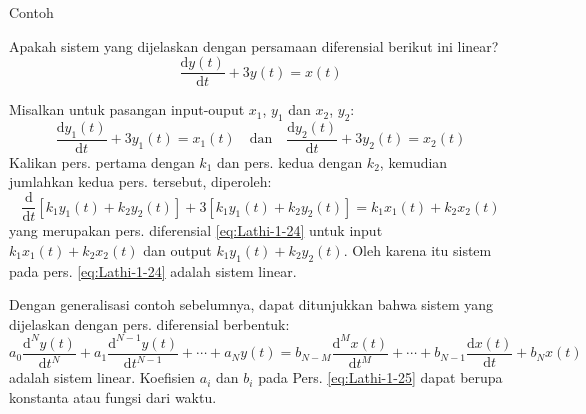 \begin{frame}{Contoh}

\fontsize{9}{10}\selectfont

Apakah sistem yang dijelaskan dengan persamaan diferensial berikut ini linear?
\begin{equation}
\frac{\mathrm{d} y(t)}{\mathrm{d}t} + 3 y(t) = x(t)
\label{eq:Lathi-1-24}
\end{equation}

Misalkan untuk pasangan input-ouput $x_1$, $y_1$ dan $x_2$, $y_2$:
\begin{equation*}
\frac{\mathrm{d} y_{1}(t)}{\mathrm{d}t} + 3 y_{1}(t) = x_{1}(t) \quad \text{dan} \quad
\frac{\mathrm{d} y_{2}(t)}{\mathrm{d}t} + 3 y_{2}(t) = x_{2}(t)
\end{equation*}
Kalikan pers. pertama dengan $k_1$ dan pers. kedua dengan $k_2$, kemudian jumlahkan
kedua pers. tersebut, diperoleh:
$$
\frac{\mathrm{d}}{\mathrm{d}t} \left[
  k_{1} y_{1}(t) + k_{2} y_{2}(t) \right] +
3 \left[ k_{1} y_{1}(t) + k_{2} y_{2}(t) \right] =
k_{1} x_{1}(t) + k_{2} x_{2}(t)
$$
yang merupakan pers. diferensial \eqref{eq:Lathi-1-24} untuk input
$k_{1} x_{1}(t) + k_{2} x_{2}(t)$ dan output $k_{1} y_{1}(t) + k_{2} y_{2}(t)$.
Oleh karena itu sistem pada pers. \eqref{eq:Lathi-1-24} adalah sistem linear.

\end{frame}


\begin{frame}

Dengan generalisasi contoh sebelumnya, dapat ditunjukkan bahwa sistem yang dijelaskan
dengan pers. diferensial berbentuk:
\begin{equation}
a_0 \frac{\mathrm{d}^{N} y(t)}{\mathrm{d}t^{N}} + a_1 \frac{\mathrm{d}^{N-1} y(t)}{\mathrm{d}t^{N-1}} +
\cdots + a_{N} y(t) = b_{N-M} \frac{\mathrm{d}^{M} x(t)}{\mathrm{d}t^{M}} + \cdots +
b_{N-1} \frac{\mathrm{d} x(t)}{\mathrm{d}t} + b_{N} x(t)
\label{eq:Lathi-1-25}
\end{equation}
adalah sistem linear. Koefisien $a_{i}$ dan $b_{i}$ pada Pers. \eqref{eq:Lathi-1-25} dapat berupa
konstanta atau fungsi dari waktu.

\end{frame}